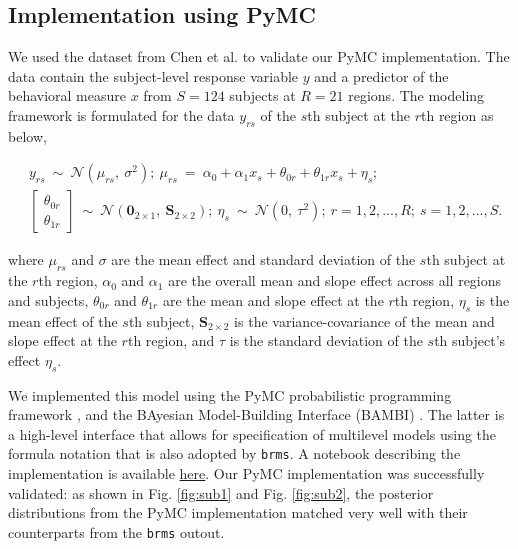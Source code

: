 \documentclass[../main.tex]{subfiles}
\begin{document}
\subsection{Implementation using PyMC}

We used the dataset from Chen et al.\cite{chenHandlingMultiplicityNeuroimaging2019} to validate our PyMC implementation. The data contain the subject-level response variable $y$ and a predictor of the behavioral measure $x$ from $S=124$ subjects at $R=21$ regions. The modeling framework is formulated for the data $y_{rs}$ of the $s$th subject at the $r$th region as below, 
\begin{linenomath*}
\begin{equation}\label{eq:bml}
\begin{split}
&y_{rs} ~\sim ~\mathcal{N}(\mu_{rs},~\sigma^2);~\mu_{rs} ~=~\alpha_0+\alpha_1 x_s + \theta_{0r}+\theta_{1r} x_s +\eta_s;\\%
&\begin{bmatrix}
\theta_{0r} \\
\theta_{1r} 
\end{bmatrix}~\sim~\mathcal{N}(\boldsymbol{0}_{2\times 1},~\boldsymbol{S}_{2\times 2});~
\eta_{s} ~\sim~\mathcal{N}(0,~\tau^2);~
r=1,2,...,R;~s=1,2,...,S.
\end{split}
\end{equation}
\end{linenomath*}
where $\mu_{rs}$ and $\sigma$ are the mean effect and standard deviation of the $s$th subject at the $r$th region, $\alpha_0$ and $\alpha_1$ are the overall mean and slope effect across all regions and subjects, $\theta_{0r}$ and $\theta_{1r}$ are the mean and slope effect at the $r$th region, $\eta_s$ is the mean effect of the $s$th subject, $\boldsymbol{S}_{2\times 2}$ is the variance-covariance of the mean and slope effect at the $r$th region, and $\tau$ is the standard deviation of the $s$th subject's effect $\eta_s$.%

We implemented this model using the PyMC probabilistic programming framework \cite{Salvatier2016}, and the BAyesian Model-Building Interface (BAMBI) \cite{capretto2020}. The latter is a high-level interface that allows for specification of multilevel models using the formula notation that is also adopted by \texttt{brms}. A notebook describing the implementation is available \href{https://github.com/crnolan/pyrba}{here}. Our PyMC implementation was successfully validated: as shown in Fig. \ref{fig:sub1} and Fig. \ref{fig:sub2},  the posterior distributions from the PyMC implementation matched very well with their counterparts from the \texttt{brms} outout.%
\end{document}
